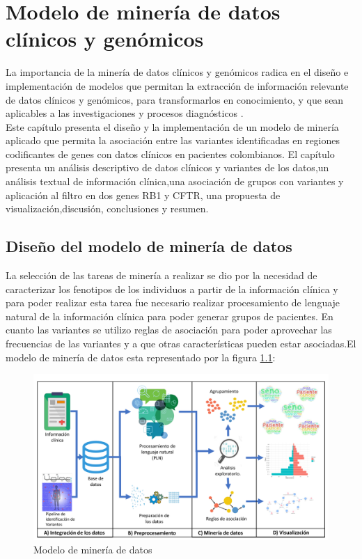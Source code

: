 \chapter{Modelo de minería de datos clínicos y genómicos}

La importancia de la minería de datos clínicos y genómicos radica en el diseño e implementación de modelos que permitan la extracción de información relevante de datos clínicos y genómicos, para transformarlos en conocimiento, y que sean aplicables a las investigaciones y procesos diagnósticos \cite{Farid2016}. \\  

Este capítulo presenta el diseño y la implementación de un modelo de minería aplicado que permita la asociación entre las variantes identificadas en regiones codificantes de genes con datos clínicos en pacientes colombianos. El capítulo presenta un análisis descriptivo de datos clínicos y variantes de los datos,un análisis textual de información clínica,una asociación de grupos con variantes y aplicación al filtro en dos genes RB1 y CFTR, una propuesta de visualización,discusión, conclusiones y resumen. 

\section{Diseño del modelo de minería de datos}

La selección de las tareas de minería a realizar se dio por la necesidad de caracterizar los fenotipos de los individuos a partir de la información clínica y para poder realizar esta tarea fue necesario realizar procesamiento de lenguaje natural de la información clínica  para poder generar grupos de pacientes. En cuanto las variantes se utilizo reglas de asociación para poder aprovechar las frecuencias de las variantes y a que otras características pueden estar asociadas.El modelo de minería de datos esta representado por la figura  \ref{fig:kdd}:\\

\begin{figure}[]
	\centering
	\includegraphics[width=1\textwidth]{Kap4/KDDtesis.pdf}
	\caption{Modelo de minería de datos}
	\label{fig:kdd}
\end{figure}


